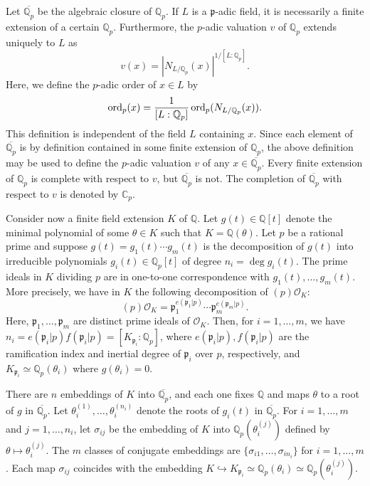 Let $\overline{\mathbb{Q}_p}$ be the algebraic closure of $\mathbb{Q}_p$. If $L$ is a $\mathfrak{p}$-adic field, it is necessarily a finite extension of a certain $\mathbb{Q}_p$. Furthermore, the $p$-adic valuation $v$ of $\mathbb{Q}_p$ extends uniquely to $L$ as 
\[v(x) = |N_{L/\mathbb{Q}_p}(x)|^{1/[L:\mathbb{Q}_p]}.\]
Here, we define the $p$-adic order of $x \in L$ by
\[\operatorname{ord}_p(x) = \frac{1}{[L:\mathbb{Q}_p]}\operatorname{ord}_p(N_{L/\mathbb{Q}_p}(x)).\]
This definition is independent of the field $L$ containing $x$. Since each element of $\overline{\mathbb{Q}_p}$ is by definition contained in some finite extension of $\mathbb{Q}_p$, the above definition may be used to define the $p$-adic valuation $v$ of any $x \in \overline{\mathbb{Q}_p}$. Every finite extension of $\mathbb{Q}_p$ is complete with respect to $v$, but $\overline{\mathbb{Q}_p}$ is not. The completion of $\overline{\mathbb{Q}_p}$ with respect to $v$ is denoted by $\mathbb{C}_p$. 

Consider now a finite field extension $K$ of $\mathbb{Q}$. Let $g(t) \in \mathbb{Q}[t]$ denote the minimal polynomial of some $\theta \in K$ such that $K = \mathbb{Q}(\theta)$. Let $p$ be a rational prime and suppose $g(t) = g_1(t) \cdots g_m(t)$ is the decomposition of $g(t)$ into irreducible polynomials $g_i(t) \in \mathbb{Q}_p[t]$ of degree $n_i = \deg g_i(t)$. The prime ideals in $K$ dividing $p$ are in one-to-one correspondence with $g_1(t), \dots, g_m(t)$. More precisely, we have in $K$ the following decomposition of $(p)\mathcal{O}_K$:
\[(p)\mathcal{O}_K = \mathfrak{p}_1^{e(\mathfrak{p}_1|p)} \cdots \mathfrak{p}_m^{e(\mathfrak{p}_m|p)}.\]
Here, $\mathfrak{p}_1, \dots, \mathfrak{p}_m$ are distinct prime ideals of $\mathcal{O}_K$. Then, for $i = 1, \dots, m$, we have $n_i = e(\mathfrak{p}_i | p)f(\mathfrak{p}_i | p) =  [K_{\mathfrak{p}_i} : \mathbb{Q}_p]$, where $e(\mathfrak{p}_i | p), f(\mathfrak{p}_i | p)$ are the ramification index and inertial degree of $\mathfrak{p}_i$ over $p$, respectively, and $K_{\mathfrak{p}_i} \simeq \mathbb{Q}_p(\theta_i)$ where $g(\theta_i) = 0$. 

There are $n$ embeddings of $K$ into $\overline{\mathbb{Q}_p}$, and each one fixes $\mathbb{Q}$ and maps $\theta$ to a root of $g$ in $\overline{\mathbb{Q}_p}$. Let $\theta_i^{(1)}, \dots, \theta_i^{(n_i)}$ denote the roots of $g_i(t)$ in $\overline{\mathbb{Q}_p}$. For $i = 1, \dots, m$ and $j = 1, \dots, n_i$, let $\sigma_{ij}$ be the embedding of $K$ into $\mathbb{Q}_p(\theta_i^{(j)})$ defined by $\theta \mapsto \theta_i^{(j)}$. The $m$ classes of conjugate embeddings are $\{\sigma_{i1}, \dots, \sigma_{in_i}\}$ for $i = 1, \dots, m$. Each map $\sigma_{ij}$ coincides with the embedding $K \hookrightarrow K_{\mathfrak{p}_i} \simeq \mathbb{Q}_p(\theta_i) \simeq \mathbb{Q}_p(\theta_i^{(j)})$. 

